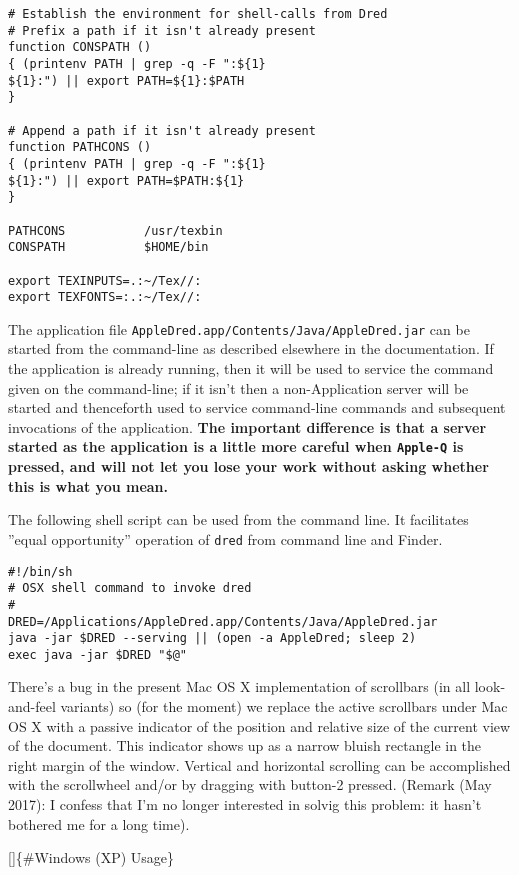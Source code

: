 \documentclass[
]{article}
\begin{document}
\begin{verbatim}
# Establish the environment for shell-calls from Dred
# Prefix a path if it isn't already present
function CONSPATH ()
{ (printenv PATH | grep -q -F ":${1}
${1}:") || export PATH=${1}:$PATH
}

# Append a path if it isn't already present
function PATHCONS ()
{ (printenv PATH | grep -q -F ":${1}
${1}:") || export PATH=$PATH:${1}
}

PATHCONS           /usr/texbin
CONSPATH           $HOME/bin

export TEXINPUTS=.:~/Tex//:
export TEXFONTS=:.:~/Tex//:
\end{verbatim}

The application file \texttt{AppleDred.app/Contents/Java/AppleDred.jar}
can be started from the command-line as described elsewhere in the
documentation. If the application is already running, then it will be
used to service the command given on the command-line; if it isn't then
a non-Application server will be started and thenceforth used to service
command-line commands and subsequent invocations of the application.
\textbf{The important difference is that a server started as the
application is a little more careful when \texttt{Apple-Q} is pressed,
and will not let you lose your work without asking whether this is what
you mean.}

The following shell script can be used from the command line. It
facilitates ''equal opportunity'' operation of \texttt{dred} from
command line and Finder.

\begin{verbatim}
#!/bin/sh
# OSX shell command to invoke dred
#
DRED=/Applications/AppleDred.app/Contents/Java/AppleDred.jar
java -jar $DRED --serving || (open -a AppleDred; sleep 2)
exec java -jar $DRED "$@" 
\end{verbatim}

There's a bug in the present Mac OS X implementation of scrollbars (in
all look-and-feel variants) so (for the moment) we replace the active
scrollbars under Mac OS X with a passive indicator of the position and
relative size of the current view of the document. This indicator shows
up as a narrow bluish rectangle in the right margin of the window.
Vertical and horizontal scrolling can be accomplished with the
scrollwheel and/or by dragging with button-2 pressed. (Remark (May
2017): I confess that I'm no longer interested in solvig this problem:
it hasn't bothered me for a long time).

{[}{]}\{\#Windows (XP) Usage\}
\end{document}
